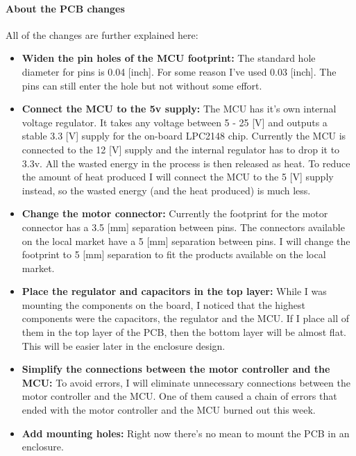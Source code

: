\documentclass{article}
\begin{document}
\paragraph{About the PCB changes}
All of the changes are further explained here:
\begin{itemize}
    \item \textbf{Widen the pin holes of the MCU footprint:} The standard hole diameter for pins is 0.04 [inch]. For some reason I've used 0.03 [inch]. The pins can still enter the hole but not without some effort.
    \item \textbf{Connect the MCU to the 5v supply:} The MCU has it's own internal voltage regulator. It takes any voltage between 5 - 25 [V] and outputs a stable 3.3 [V] supply for the on-board LPC2148 chip. Currently the MCU is connected to the 12 [V] supply and the internal regulator has to drop it to 3.3v. All the wasted energy in the process is then released as heat. To reduce the amount of heat produced I will connect the MCU to the 5 [V] supply instead, so the wasted energy (and the heat produced) is much less.
    \item \textbf{Change the motor connector:} Currently the footprint for the motor connector has a 3.5 [mm] separation between pins. The connectors available on the local market have a 5 [mm] separation between pins. I will change the footprint to 5 [mm] separation to fit the products available on the local market.
    \item \textbf{Place the regulator and capacitors in the top layer:} While I was mounting the components on the board, I noticed that the highest components were the capacitors, the regulator and the MCU. If I place all of them in the top layer of the PCB, then the bottom layer will be almost flat. This will be easier later in the enclosure design.
    \item \textbf{Simplify the connections between the motor controller and the MCU:} To avoid errors, I will eliminate unnecessary connections between the motor controller and the MCU. One of them caused a chain of errors that ended with the motor controller and the MCU burned out this week.
    \item \textbf{Add mounting holes:} Right now there's no mean to mount the PCB in an enclosure.
\end{itemize}
\end{document}

